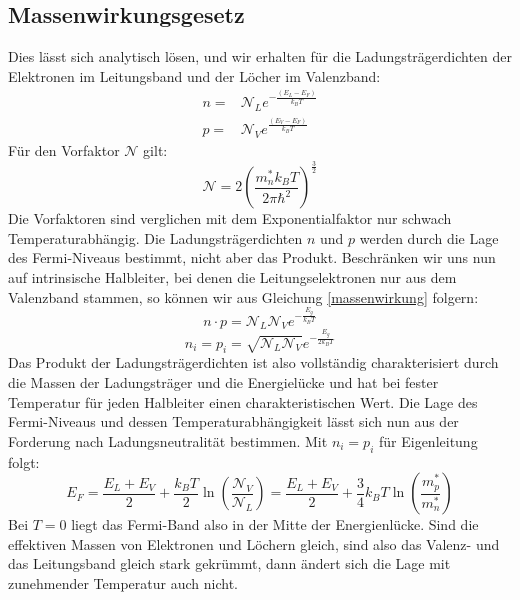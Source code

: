 \documentclass[11pt]{article}
\begin{document}
\subsection{Massenwirkungsgesetz}
Dies lässt sich analytisch lösen, und wir erhalten für die Ladungsträgerdichten
der Elektronen im Leitungsband und der Löcher im Valenzband:
\begin{equation}\label{massenwirkung}
  \begin{align}
    n=&\mathcal{N}_Le^{-\frac{(E_L-E_F)}{k_BT}}\\
    p=&\mathcal{N}_Ve^{\frac{(E_V-E_F)}{k_BT}}
  \end{align}
\end{equation}
Für den Vorfaktor $\mathcal{N}$ gilt:
\begin{equation}
  \mathcal{N}=2\left(\frac{m_n^*k_BT}{2\pi\hbar^2}\right)^{\frac{3}{2}}
\end{equation}
Die Vorfaktoren sind verglichen mit dem Exponentialfaktor nur schwach
Temperaturabhängig.
Die Ladungsträgerdichten $n$ und $p$ werden durch die Lage des Fermi-Niveaus
bestimmt, nicht aber das Produkt. Beschränken wir uns nun auf intrinsische
Halbleiter, bei denen die Leitungselektronen nur aus dem Valenzband stammen, so
können wir aus Gleichung \ref{massenwirkung} folgern:
\begin{equation}
  n\cdot p=\mathcal{N}_L\mathcal{N}_Ve^{-\frac{E_g}{k_BT}}
\end{equation}
\begin{equation}
  n_i=p_i=\sqrt{\mathcal{N}_L\mathcal{N}_V}e^{-\frac{E_g}{2k_BT}}
\end{equation}
Das Produkt der Ladungsträgerdichten ist also vollständig charakterisiert durch
die Massen der Ladungsträger und die Energielücke und hat bei fester Temperatur
für jeden Halbleiter einen charakteristischen Wert. Die Lage des Fermi-Niveaus
und dessen Temperaturabhängigkeit lässt sich nun aus der Forderung nach
Ladungsneutralität bestimmen. Mit $n_i=p_i$ für Eigenleitung folgt:
\begin{equation}
  E_F=\frac{E_L+E_V}{2}+\frac{k_BT}{2}\ln(\frac{\mathcal{N}_V}{\mathcal{N}_L})
  =\frac{E_L+E_V}{2}+\frac{3}{4}k_BT\ln(\frac{m^*_p}{m^*_n})
\end{equation}
Bei $T=0$ liegt das Fermi-Band also in der Mitte der Energienlücke. Sind die
effektiven Massen von Elektronen und Löchern gleich, sind also das Valenz- und
das Leitungsband gleich stark gekrümmt, dann ändert sich die Lage mit
zunehmender Temperatur auch nicht.
\end{document}
